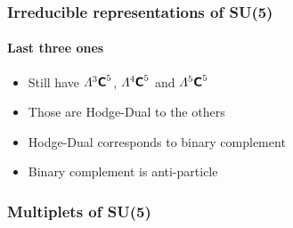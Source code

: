 \documentclass[english, fleqn]{beamer}
\begin{document}
\begin{frame}
    \frametitle{Irreducible representations of SU(5)}
    \framesubtitle{Last three ones}

    \begin{itemize}
        \item 
            Still have $\Lambda^3 \text{\bfseries\sffamily{C}}^5$, $\Lambda^4 \text{\bfseries\sffamily{C}}^5$ and $\Lambda^5 \text{\bfseries\sffamily{C}}^5$
        \item
            Those are Hodge-Dual to the others
        \item
            Hodge-Dual corresponds to binary complement
        \item
            Binary complement is anti-particle
    \end{itemize}
\end{frame}

\begin{frame}
    \frametitle{Multiplets of SU(5)}


\end{frame}
\end{document}
